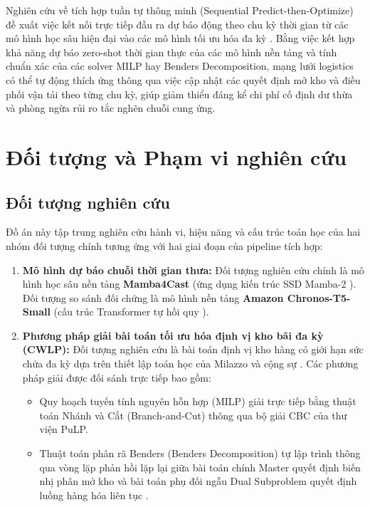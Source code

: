 Nghiên cứu về tích hợp tuần tự thông minh (Sequential Predict-then-Optimize) đề xuất việc kết nối trực tiếp đầu ra dự báo động theo chu kỳ thời gian từ các mô hình học sâu hiện đại vào các mô hình tối ưu hóa đa kỳ \cite{milazzo2022}. Bằng việc kết hợp khả năng dự báo zero-shot thời gian thực của các mô hình nền tảng \cite{bhethanabhotla2024} và tính chuẩn xác của các solver MILP hay Benders Decomposition, mạng lưới logistics có thể tự động thích ứng thông qua việc cập nhật các quyết định mở kho và điều phối vận tải theo từng chu kỳ, giúp giảm thiểu đáng kể chi phí cố định dư thừa và phòng ngừa rủi ro tắc nghẽn chuỗi cung ứng.

\section{Đối tượng và Phạm vi nghiên cứu}

\subsection{Đối tượng nghiên cứu}
Đồ án này tập trung nghiên cứu hành vi, hiệu năng và cấu trúc toán học của hai nhóm đối tượng chính tương ứng với hai giai đoạn của pipeline tích hợp:
\begin{enumerate}
    \item \textbf{Mô hình dự báo chuỗi thời gian thưa:} Đối tượng nghiên cứu chính là mô hình học sâu nền tảng \textbf{Mamba4Cast} (ứng dụng kiến trúc SSD Mamba-2 \cite{bhethanabhotla2024, dao2024}). Đối tượng so sánh đối chứng là mô hình nền tảng \textbf{Amazon Chronos-T5-Small} (cấu trúc Transformer tự hồi quy \cite{ansari2024}).
    \item \textbf{Phương pháp giải bài toán tối ưu hóa định vị kho bãi đa kỳ (CWLP):} Đối tượng nghiên cứu là bài toán định vị kho hàng có giới hạn sức chứa đa kỳ dựa trên thiết lập toán học của Milazzo và cộng sự \cite{milazzo2022}. Các phương pháp giải được đối sánh trực tiếp bao gồm:
        \begin{itemize}
            \item Quy hoạch tuyến tính nguyên hỗn hợp (MILP) giải trực tiếp bằng thuật toán Nhánh và Cắt (Branch-and-Cut) thông qua bộ giải CBC của thư viện PuLP.
            \item Thuật toán phân rã Benders (Benders Decomposition) tự lập trình thông qua vòng lặp phản hồi lặp lại giữa bài toán chính Master quyết định biến nhị phân mở kho và bài toán phụ đối ngẫu Dual Subproblem quyết định luồng hàng hóa liên tục \cite{sadatasl2021}.
        \end{itemize}
\end{enumerate}

